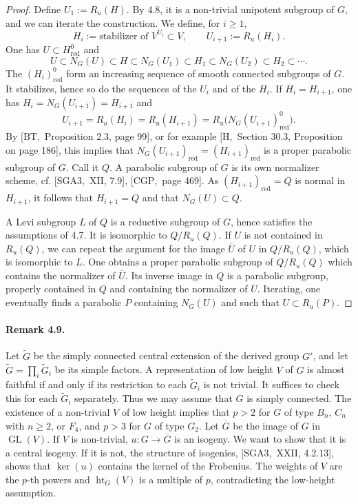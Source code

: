 \documentclass[11pt]{article}
\newcommand{\GL}{\operatorname{GL}}
\newcommand{\red}{\mathrm{red}}
\newcommand{\htG}{\operatorname{ht}_G}
\begin{document}
\begin{proof}
Define \(U_1:=R_u(H)\). By 4.8, it is a non-trivial unipotent subgroup of \(G\), and
we can iterate the construction. We define, for \(i\ge1\),
\[
  H_i:=\text{stabilizer of }V^{U_i}\subset V,
  \qquad U_{i+1}:=R_u(H_i).
\]
One has \(U\subset H^0_{\red}\) and
\begin{equation}
  U\subset N_G(U)\subset H\subset N_G(U_1)\subset H_1
  \subset N_G(U_2)\subset H_2\subset\cdots .
  \tag{4.8.1}
\end{equation}
The \((H_i)^0_{\red}\) form an increasing sequence of smooth connected subgroups of
\(G\). It stabilizes, hence so do the sequences of the \(U_i\) and of the \(H_i\). If
\(H_i=H_{i+1}\), one has \(H_i=N_G(U_{i+1})=H_{i+1}\) and
\[
  U_{i+1}=R_u(H_i)=R_u(H_{i+1})=R_u\bigl(N_G(U_{i+1})^0_{\red}\bigr).
\]
By \([\mathrm{BT},\) Proposition 2.3, page 99], or for example
\([\mathrm H,\) Section 30.3, Proposition on page 186], this implies that
\(N_G(U_{i+1})_{\red}=(H_{i+1})_{\red}\) is a proper parabolic subgroup of \(G\).
Call it \(Q\). A parabolic subgroup of \(G\) is its own normalizer scheme, cf.
\([\mathrm{SGA3},\) XII, 7.9], \([\mathrm{CGP},\) page 469]. As
\((H_{i+1})_{\red}=Q\) is normal in \(H_{i+1}\), it follows that \(H_{i+1}=Q\) and
that \(N_G(U)\subset Q\).

A Levi subgroup \(L\) of \(Q\) is a reductive subgroup of \(G\), hence satisfies the
assumptions of 4.7. It is isomorphic to \(Q/R_u(Q)\). If \(U\) is not contained in
\(R_u(Q)\), we can repeat the argument for the image \(\overline U\) of \(U\) in
\(Q/R_u(Q)\), which is isomorphic to \(L\). One obtains a proper parabolic subgroup of
\(Q/R_u(Q)\) which contains the normalizer of \(\overline U\). Its inverse image in \(Q\)
is a parabolic subgroup, properly contained in \(Q\) and containing the normalizer of
\(U\). Iterating, one eventually finds a parabolic \(P\) containing \(N_G(U)\) and such
that \(U\subset R_u(P)\).
\end{proof}

\paragraph{Remark 4.9.}
Let \(\widetilde G\) be the simply connected central extension of the derived group
\(G'\), and let \(\widetilde G=\prod_i\widetilde G_i\) be its simple factors. A
representation of low height \(V\) of \(G\) is almost faithful if and only if its
restriction to each \(\widetilde G_i\) is not trivial. It suffices to check this for each
\(\widetilde G_i\) separately. Thus we may assume that \(G\) is simply connected. The
existence of a non-trivial \(V\) of low height implies that \(p>2\) for \(G\) of type
\(B_n\), \(C_n\) with \(n\ge2\), or \(F_4\), and \(p>3\) for \(G\) of type \(G_2\).
Let \(\overline G\) be the image of \(G\) in \(\GL(V)\). If \(V\) is non-trivial,
\(u:G\to\overline G\) is an isogeny. We want to show that it is a central isogeny. If it
is not, the structure of isogenies, \([\mathrm{SGA3},\) XXII, 4.2.13], shows that
\(\ker(u)\) contains the kernel of the Frobenius. The weights of \(V\) are the
\(p\)-th powers and \(\htG(V)\) is a multiple of \(p\), contradicting the low-height
assumption.
\end{document}
